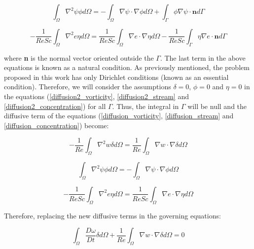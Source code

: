 \begin{equation} \label{diffusion2_stream} 
 \int_{\Omega} \nabla^2 \psi \phi d\Omega
 = - \int_{\Omega} \nabla \psi \cdot \nabla \phi d\Omega
   + \int_{\Gamma} \phi \nabla \psi \cdot \textbf{n} d\Gamma
\end{equation}

\begin{equation} \label{diffusion2_concentration} 
 - \frac{1}{\textit{ReSc}} \int_{\Omega} \nabla^2 e \eta d\Omega
 = \frac{1}{\textit{ReSc}} \int_{\Omega} \nabla e \cdot \nabla \eta d\Omega
 - \frac{1}{\textit{ReSc}} \int_{\Gamma} \eta \nabla e \cdot \textbf{n} d\Gamma
\end{equation}

\noindent
where \textbf{n} is the normal vector oriented outside the $\Gamma$. 
The last term in the above equations is known as a natural condition. 
As previously mentioned, 
the problem proposed in this work has only Dirichlet conditions 
(known as an essential condition).
Therefore,
we will consider the assumptions
$\delta = 0$, $\phi = 0$ and $\eta = 0$ in the equations (\ref{diffusion2_vorticity}, \ref{diffusion2_stream} and \ref{diffusion2_concentration})
for all $\Gamma$. 
Thus, 
the integral in $\Gamma$ will be null
and the diffusive term of the equations 
(\ref{diffusion_vorticity}, \ref{diffusion_stream} and \ref{diffusion_concentration}) become:

\begin{equation}
 - \frac{1}{\textit{Re}} \int_{\Omega} \nabla^2 w \delta d\Omega
 = \frac{1}{\textit{Re}} \int_{\Omega} \nabla w \cdot \nabla \delta d\Omega
\end{equation}

\begin{equation} 
 \int_{\Omega} \nabla^2 \psi \phi d\Omega
 = - \int_{\Omega} \nabla \psi \cdot \nabla \phi d\Omega
\end{equation}

\begin{equation} 
 - \frac{1}{\textit{ReSc}} \int_{\Omega} \nabla^2 e \eta d\Omega
 = \frac{1}{\textit{ReSc}} \int_{\Omega} \nabla e \cdot \nabla \eta d\Omega
\end{equation}

\medskip
\noindent
Therefore, replacing the new diffusive terms in the governing equations:

\begin{equation} \label{diffusion_vorticity} 
   \int_{\Omega} \frac{D \omega}{Dt} \delta d\Omega 
 + \frac{1}{\textit{Re}} \int_{\Omega} \nabla w \cdot \nabla \delta d\Omega 
 = 0
\end{equation}

